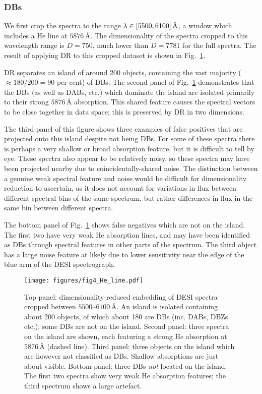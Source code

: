 \documentclass[fleqn,usenatbib]{mnras}
\begin{document}
\subsubsection{DBs}
\label{sec:DBs}

We first crop the spectra to the range $\lambda \in \qty[5500, 6100]\,\text{\AA}$, a window which includes a He line at $5876\,\text{\AA}$.
The dimensionality of the spectra cropped to this wavelength range is $D=750$, much lower than $D=7781$ for the full spectra.
The result of applying DR to this cropped dataset is shown in Fig.~\ref{fig:He_lines}.

DR separates an island of around 200 objects, containing the vast majority ($\approx 180/200=90$ per cent) of DBs.
The second panel of Fig.~\ref{fig:He_lines} demonstrates that the DBs (as well as DABs, etc.) which dominate the island are isolated primarily to their strong $5876\,\text{\AA}$ absorption.
This shared feature causes the spectral vectors to be close together in data space; this is preserved by DR in two dimensions.

The third panel of this figure shows three examples of false positives that are projected onto this island despite not being DBs.
For some of these spectra there is perhaps a very shallow or broad absorption feature, but it is difficult to tell by eye.
These spectra also appear to be relatively noisy, so these spectra may have been projected nearby due to coincidentally-shared noise.
The distinction between a genuine weak spectral feature and noise would be difficult for dimensionality reduction to ascertain, as it does not account for variations in flux between different spectral bins of the same spectrum, but rather differences in flux in the same bin between different spectra.

The bottom panel of Fig.~\ref{fig:He_lines} shows false negatives which are not on the island.
The first two have very weak He absorption lines, and may have been identified as DBs through spectral features in other parts of the spectrum.
The third object has a large noise feature at likely due to lower sensitivity near the edge of the blue arm of the DESI spectrograph.

\begin{figure}
\centering
\texttt{[image: figures/fig4\_He\_line.pdf]}
\caption{
    Top panel: dimensionality-reduced embedding of DESI spectra cropped between $5500$--$6100\,\text{\AA}$.
    An island is isolated containing about 200 objects, of which about 180 are DBs (inc. DABs, DBZs etc.); some DBs are not on the island.
    Second panel: three spectra on the island are shown, each featuring a strong He absorption at $5876\,\text{\AA}$ (dashed line).
    Third panel: three objects on the island which are however not classified as DBs.
    Shallow absorptions are just about visible.
    Bottom panel: three DBs \textit{not} located on the island.
    The first two spectra show very weak He absorption features; the third spectrum shows a large artefact.
}
\label{fig:He_lines}
\end{figure}
\end{document}
